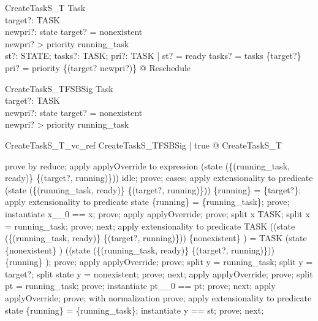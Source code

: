 \begin{schema}{CreateTaskS\_T}
  \Delta Task\\
  target?: TASK\\
  newpri?: \nat 
\where
  state target? = nonexistent\\
  newpri? > priority running\_task\\
  \exists  st?: STATE; tasks?: \power  TASK; pri?: TASK \fun  \nat  | st? = ready \land  tasks? = tasks \cup  \{target?\} \land  pri? = priority \oplus  \{(target? \mapsto  newpri?)\} @ Reschedule
\end{schema}

\begin{schema}{CreateTaskS\_TFSBSig}
  Task\\
  target?: TASK\\
  newpri?: \nat 
\where
  state target? = nonexistent\\
  newpri? > priority running\_task
\end{schema}

\begin{theorem}{CreateTaskS\_T\_vc\_ref}
\forall  CreateTaskS\_TFSBSig | true @ \pre  CreateTaskS\_T
\end{theorem}

\begin{zproof}
prove by reduce;
apply applyOverride to expression (state \oplus  (\{(running\_task, ready)\} \cup  \{(target?, running)\})) idle;
prove;
cases;
apply extensionality to predicate (state \oplus  (\{(running\_task, ready)\} \cup  \{(target?, running)\})) \inv  \limg  \{running\} \rimg  = \{target?\};
apply extensionality to predicate state \inv  \limg  \{running\} \rimg  = \{running\_task\};
prove;
instantiate x\_\_0 == x;
prove;
apply applyOverride;
prove;
split x \in  TASK;
split x = running\_task;
prove;
next;
apply extensionality to predicate TASK \setminus  ((state \oplus  (\{(running\_task, ready)\} \cup  \{(target?, running)\})) \inv  \limg  \{nonexistent\} \rimg ) = TASK \setminus  (state \inv  \limg  \{nonexistent\} \rimg ) \cup  ((state \oplus  (\{(running\_task, ready)\} \cup  \{(target?, running)\})) \inv  \limg  \{running\} \rimg );
prove;
apply applyOverride;
prove;
split y = running\_task;
split y = target?;
split \lnot  state y = nonexistent;
prove;
next;
apply applyOverride;
prove;
split pt = running\_task;
prove;
instantiate pt\_\_0 == pt;
prove;
next;
apply applyOverride;
prove;
with normalization prove;
apply extensionality to predicate state \inv  \limg  \{running\} \rimg  = \{running\_task\};
instantiate y == st;
prove;
next;
\end{zproof}

